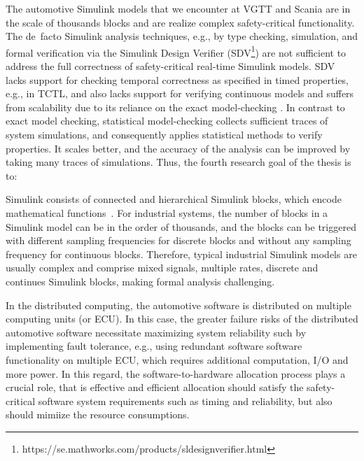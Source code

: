 The automotive Simulink models that we encounter at VGTT and Scania are in the scale of thousands blocks and are realize complex safety-critical functionality. %
The de~facto Simulink analysis techniques, e.g., by type checking, simulation, and formal verification via the Simulink Design Verifier (SDV\footnote{https://se.mathworks.com/products/sldesignverifier.html}) are not sufficient to address the full correctness of safety-critical real-time Simulink models. SDV lacks support for checking temporal correctness as specified in timed properties, e.g., in TCTL, and also lacks support for verifying continuous models and suffers from scalability due to its reliance on the exact model-checking \cite{Leitner2008SimulinkStudy}. In contrast to exact model checking, statistical model-checking collects sufficient traces of system simulations, and consequently applies statistical methods to verify properties. It scales better, and the accuracy of the analysis can be improved by taking many traces of simulations. Thus, the fourth research goal of the thesis is to:
\begin{researchgoal}
\end{researchgoal}

Simulink consists of connected and hierarchical Simulink blocks, which encode mathematical functions~\cite{JamesB.Dabney2003MasteringSimulink}. For industrial systems, the number of blocks in a Simulink model can be in the order of thousands, and the blocks can be triggered with different sampling frequencies for discrete blocks and without any sampling frequency 
for continuous blocks. Therefore, typical industrial Simulink models are usually complex and comprise mixed signals, multiple rates, discrete and continues Simulink blocks, making formal analysis challenging.

In the distributed computing, the automotive software is distributed on multiple computing units (or ECU). In this case, the greater failure risks of the distributed automotive software necessitate maximizing system reliability such by implementing fault tolerance, e.g., using redundant software software functionality on multiple ECU, which requires additional computation, I/O and more power. In this regard, the software-to-hardware allocation process plays a crucial role, that is effective and efficient allocation should satisfy the safety-critical software system requirements such as timing and reliability, but also should mimiize the resource consumptions.


